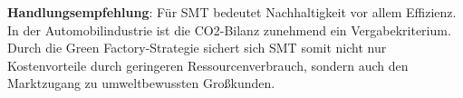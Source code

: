 \textbf{Handlungsempfehlung}: Für \acs{SMT} bedeutet Nachhaltigkeit vor allem Effizienz. In der Automobilindustrie ist die \acs{CO2}-Bilanz zunehmend ein Vergabekriterium. Durch die \glqq Green Factory\grqq-Strategie sichert sich \acs{SMT} somit nicht nur Kostenvorteile durch geringeren Ressourcenverbrauch, sondern auch den Marktzugang zu umweltbewussten Großkunden.

